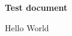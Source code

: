 \documentclass[10pt,a4paper]{article}
\begin{document}
	\textbf{Test document}
	
	\fontsize{24}{10}\selectfont
		
	\begin{flushleft}
Hello World
	\end{flushleft}	
	
\end{document}
